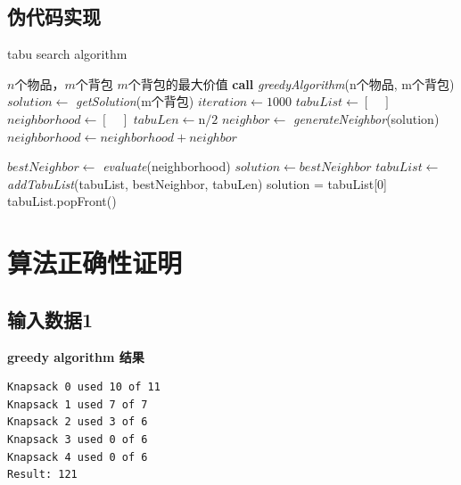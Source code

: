 \documentclass[UTF8]{ctexart}
\begin{document}
\newpage
\subsection{伪代码实现}

\begin{algorithm}
    \caption{tabu search algorithm}
    \begin{algorithmic}[1]
        \REQUIRE $n$个物品，$m$个背包
        \ENSURE $m$个背包的最大价值
        \STATE \textbf{call} \textit{greedyAlgorithm}(n个物品, m个背包)
        \STATE $solution \gets $ \textit{getSolution}(m个背包)
        \STATE $iteration \gets 1000$
        \STATE $tabuList \gets [\quad]$
        \STATE $neighborhood \gets [\quad]$
        \STATE $tabuLen \gets $n$ / 2$
        \STATE $neighbor \gets $ \textit{generateNeighbor}(solution)
        \STATE $neighborhood \gets neighborhood + neighbor$
        \ENDIF
        \ENDWHILE

        \STATE $bestNeighbor \gets $ \textit{evaluate}(neighborhood)
        \STATE $solution \gets bestNeighbor$
        \STATE $tabuList \gets $ \textit{addTabuList}(tabuList, bestNeighbor, tabuLen)
        \STATE solution = tabuList[0]
        \STATE tabuList.popFront()
        \ENDIF
        \ENDIF
        \ENDWHILE
    \end{algorithmic}
\end{algorithm}



\newpage
\section{算法正确性证明}

\subsection{输入数据1}


\noindent
\textbf{greedy algorithm 结果}

\begin{lstlisting}[numbers=none]
Knapsack 0 used 10 of 11
Knapsack 1 used 7 of 7
Knapsack 2 used 3 of 6
Knapsack 3 used 0 of 6
Knapsack 4 used 0 of 6
Result: 121
\end{lstlisting}
\end{document}
